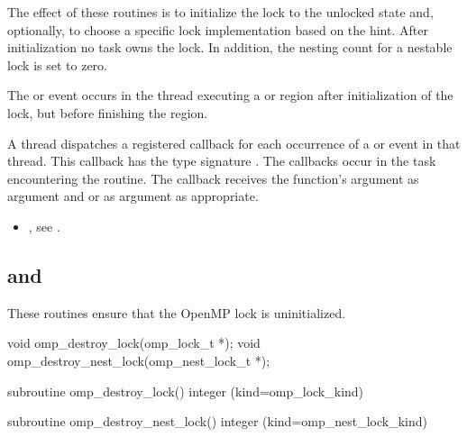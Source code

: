 \effect
The effect of these routines is to initialize the lock to the unlocked state and, optionally, to choose a specific lock implementation based on the hint. 
After initialization no task owns the lock. In addition, the nesting count for a nestable lock is set to zero.

\events

The  or  event occurs in the thread 
executing a  or  region
after initialization of the lock, but before finishing the region.

\tools

A thread dispatches a registered 
callback for each occurrence of a  or  event 
in that thread.  This callback has the type signature .
The callbacks occur in the task encountering the routine. 
The callback receives the function's  argument as
 argument and
 or 
  as  argument as appropriate.

\crossreferences
\begin{itemize}
\item {}, see
.
\end{itemize}



\subsection[\code{omp\_destroy\_lock} and \code{omp\_destroy\_nest\_lock}]{ and\\ }
\label{subsec:omp_destroy_lock and omp_destroy_nest_lock}
\summary
These routines ensure that the OpenMP lock is uninitialized.

\format
\ccppspecificstart
\begin{boxedcode}
void omp\_destroy\_lock(omp\_lock\_t *);
void omp\_destroy\_nest\_lock(omp\_nest\_lock\_t *);
\end{boxedcode}
\ccppspecificend

\fortranspecificstart
\begin{boxedcode}
subroutine omp\_destroy\_lock()
integer (kind=omp\_lock\_kind) 

subroutine omp\_destroy\_nest\_lock()
integer (kind=omp\_nest\_lock\_kind) 
\end{boxedcode}
\fortranspecificend

